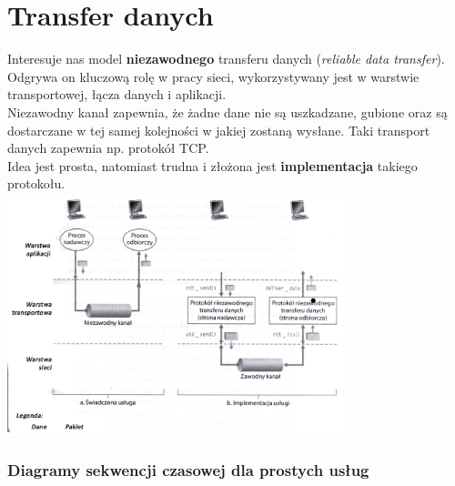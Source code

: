 \part{Transfer danych}
	Interesuje nas model \textbf{niezawodnego} transferu danych (\emph{reliable data transfer}). Odgrywa on kluczową rolę w pracy sieci, wykorzystywany jest w warstwie transportowej, łącza danych i aplikacji.\\
	Niezawodny kanał zapewnia, że żadne dane nie są uszkadzane, gubione oraz są dostarczane w tej samej kolejności w jakiej zostaną wysłane. Taki transport danych zapewnia np. protokół TCP.\\
	Idea jest prosta, natomiast trudna i złożona jest \textbf{implementacja} takiego protokołu.\\
	\includegraphics[width=10cm]{./images/image02.jpg}
	\section{Diagramy sekwencji czasowej dla prostych usług}
